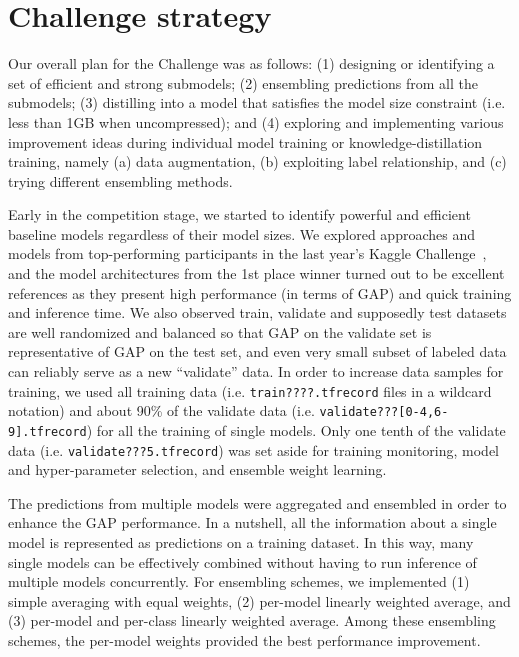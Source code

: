 \documentclass[runningheads]{llncs}
\begin{document}
\section{Challenge strategy}
Our overall plan for the Challenge was as follows:
(1) designing or identifying a set of efficient and strong submodels;
(2) ensembling predictions from all the submodels;
(3) distilling into a model that satisfies the model size constraint (i.e. less than 1GB when uncompressed); and
(4) exploring and implementing various improvement ideas during individual model training or knowledge-distillation training, namely (a) data augmentation, (b) exploiting label relationship, and (c) trying different ensembling methods.

Early in the competition stage, we started to identify powerful and efficient baseline models regardless of their model sizes.
We explored approaches and models from top-performing participants in the last year's Kaggle Challenge~\cite{kaggle2017}, and the model architectures from the 1st place winner \cite{miech2017} turned out to be excellent references as they present high performance (in terms of GAP) and quick training and inference time.
We also observed train, validate and supposedly test datasets are well randomized and balanced so that GAP on the validate set is representative of GAP on the test set, and even very small subset of labeled data can reliably serve as a new ``validate'' data.
In order to increase data samples for training, we used all training data (i.e. \texttt{train????.tfrecord} files in a wildcard notation) and about 90\% of the validate data (i.e. \texttt{validate???[0-4,6-9].tfrecord}) for all the training of single models.
Only one tenth of the validate data (i.e. \texttt{validate???5.tfrecord}) was set aside for training monitoring, model and hyper-parameter selection, and ensemble weight learning.

The predictions from multiple models were aggregated and ensembled in order to enhance the GAP performance.
In a nutshell, all the information about a single model is represented as predictions on a training dataset.
In this way, many single models can be effectively combined without having to run inference of multiple models concurrently.
For ensembling schemes, we implemented (1) simple averaging with equal weights, (2) per-model linearly weighted average, and (3) per-model and per-class linearly weighted average.
Among these ensembling schemes, the per-model weights provided the best performance improvement.
\end{document}
